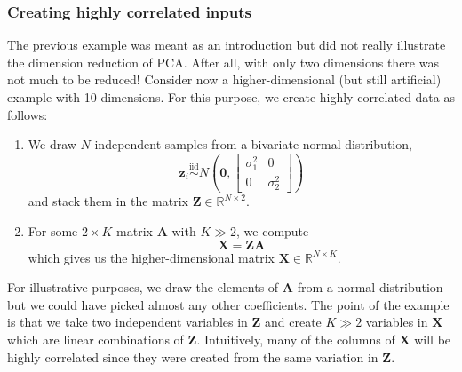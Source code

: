 \documentclass{scrartcl}
\providecommand{\tightlist}{%
      \setlength{\itemsep}{0pt}\setlength{\parskip}{0pt}}
\begin{document}
\hypertarget{creating-highly-correlated-inputs}{%
\subsubsection*{Creating highly correlated
inputs}\label{creating-highly-correlated-inputs}}

The previous example was meant as an introduction but did not really
illustrate the dimension reduction of PCA. After all, with only two
dimensions there was not much to be reduced! Consider now a
higher-dimensional (but still artificial) example with 10 dimensions.
For this purpose, we create highly correlated data as follows:

\begin{enumerate}
\def\labelenumi{\arabic{enumi}.}
\tightlist
\item
  We draw \(N\) independent samples from a bivariate normal
  distribution, \[
   \mathbf{z}_i \stackrel{\text{iid}}{\sim} N\left( \mathbf{0},
       \begin{bmatrix} \sigma_1^2 & 0 \\ 0 & \sigma_2^2 \end{bmatrix}
   \right)
   \] and stack them in the matrix
  \(\mathbf{Z} \in \mathbb{R}^{N\times 2}\).
\item
  For some \(2 \times K\) matrix \(\mathbf{A}\) with \(K \gg 2\), we
  compute \[
   \mathbf{X} = \mathbf{Z} \mathbf{A}
   \] which gives us the higher-dimensional matrix
  \(\mathbf{X} \in \mathbb{R}^{N\times K}\).
\end{enumerate}

For illustrative purposes, we draw the elements of \(\mathbf{A}\) from a
normal distribution but we could have picked almost any other
coefficients. The point of the example is that we take two independent
variables in \(\mathbf{Z}\) and create \(K \gg 2\) variables in
\(\mathbf{X}\) which are linear combinations of \(\mathbf{Z}\).
Intuitively, many of the columns of \(\mathbf{X}\) will be highly
correlated since they were created from the same variation in
\(\mathbf{Z}\).
\end{document}
